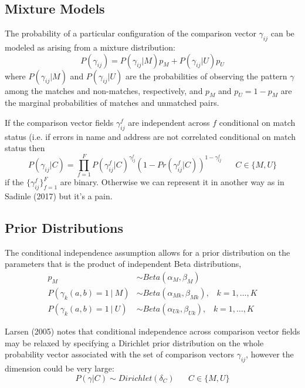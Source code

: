 \documentclass[11pt,reqno]{amsart}
\begin{document}

\subsection{Mixture Models} The probability of a particular configuration of the comparison vector $\gamma_{ij}$ can be modeled as arising from a mixture distribution:
\begin{equation}
P(\gamma_{ij}) = P(\gamma_{ij} | M) p_M + P(\gamma_{ij} | U) p_U 
\end{equation}
where $P(\gamma_{ij} | M)$ and $P(\gamma_{ij} | U)$ are the probabilities of observing the pattern $\gamma$ among the matches and non-matches, respectively, and $p_M$ and $p_U = 1-p_M$ are the marginal probabilities of matches and unmatched pairs. 
 
If the comparison vector fields $\gamma_{ij}^f$ are independent across $f$ conditional on match status (i.e. if errors in name and address are not correlated conditional on match status %
then
 $$P(\gamma_{ij} | C) = \prod_{f=1}^F P(\gamma_{ij}^f | C)^{\gamma_{ij}^f}(1-Pr(\gamma_{ij}^f | C))^{1-\gamma_{ij}^f} \hspace{20pt} C\in \{M, U\} $$
 if the $\{\gamma_{ij}^f\}_{f=1}^F$ are binary.  %
 Otherwise we can represent it in another way as in Sadinle (2017) but it's a pain.
 
\subsection{Prior Distributions} The conditional independence assumption allows for a prior distribution on the parameters that is the product of independent Beta distributions, 
\begin{align*}
p_M &\sim Beta(\alpha_M, \beta_M) \\
P(\gamma_{k} (a,b) =1\ |\ M) &\sim Beta(\alpha_{Mk}, \beta_{Mk}), \hspace{10pt} k = 1,\dots, K \\
P(\gamma_{k} (a,b) =1 \ |\  U) &\sim Beta(\alpha_{Uk}, \beta_{Uk}), \hspace{10pt} k = 1,\dots, K
\end{align*} 
 
Larsen (2005) notes that conditional independence across comparison vector fields may be relaxed by specifying a Dirichlet prior distribution on the whole probability vector associated with the set of comparison vectors $\gamma_{ij}$, however the dimension could be very large:
\[ P(\gamma | C) \sim Dirichlet(\delta_C) \hspace{20pt} C\in\{M,U\}\]
\end{document}
